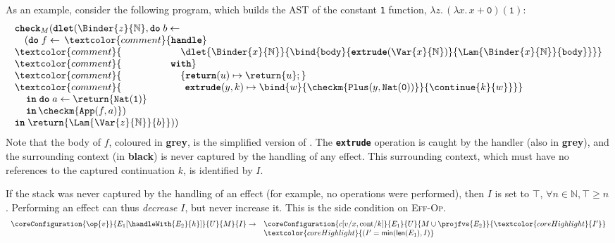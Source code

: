 As an example, consider the following program, which builds the AST of the constant \texttt{1} function, $\lambda z. \, (\lambda x. \, x + \texttt{0}) (\texttt{1})$:
\[\begin{array}{l}
  \textbf{\texttt{check}}_M(\textbf{\texttt{dlet}}(\Binder{z}{\mathbb{N}}, \textbf{\texttt{do}} \; b \leftarrow \, \\ 
  \quad (\textbf{\texttt{do}} \; f \leftarrow \, \textcolor{comment}{\textbf{\texttt{handle}}} \\
  \textcolor{comment}{\;\;\;\,\quad \quad \quad\quad\quad {\dlet{\Binder{x}{\mathbb{N}}}{
  \bind{\texttt{body}}{\textbf{\texttt{extrude}}(\Var{x}{\mathbb{N}})}{\Lam{\Binder{x}{\mathbb{N}}}{\texttt{body}}}}}} \\ 
  \textcolor{comment}{\;\;\;\,\quad \quad\quad\quad \textbf{\texttt{with}}} \\ 
  \textcolor{comment}{\;\;\;\,\quad \quad\quad\quad \quad \{ \textbf{\texttt{return}}(u) \mapsto {\return{u}};} \\ 
  \textcolor{comment}{\;\;\;\, \quad \quad\quad\quad \quad \;\, \textbf{\texttt{extrude}}(y, k) \mapsto {\bind{w}{\checkm{\texttt{Plus}(y, \texttt{Nat}(\texttt{0}))}}{\continue{k}{w}}}\}} \\ 
  \, \quad \textbf{\texttt{in}} \; \textbf{\texttt{do}} \; {a}\leftarrow {\return{\texttt{Nat}(\texttt{1})}}\\
  \, \quad \textbf{\texttt{in}} \, {\checkm{\texttt{App}(f, a)}})\; \\
  \textbf{\texttt{in}} \; \return{\Lam{\Var{z}{\mathbb{N}}}{b}})) 
\end{array}\]
Note that the body of $f$, coloured in \textbf{\textcolor{comment}{grey}}, is the simplified version of . The \textbf{\texttt{extrude}} operation is caught by the handler (also in \textbf{\textcolor{comment}{grey}}), and the surrounding context (in \textbf{black}) is never captured by the handling of any effect. This surrounding context, which must have no references to the captured continuation $k$, is identified by $I$.

If the stack was never captured by the handling of an effect (for example, no operations were performed), then $I$ is set to $\top$, $\forall n \in \mathbb{N}, \top \geq n$. Performing an effect can thus \textit{decrease} $I$, but never increase it. This is the side condition on \textsc{Eff-Op}.
\[\begin{array}{ll}\coreConfiguration{\op{v}}{E_1[\handleWith{E_2}{h}]}{U}{M}{I} \to & \coreConfiguration{c[v/x, \text{cont}/ k]}{E_1}{U}{{M \cup \projfvs{E_2}}}{\textcolor{coreHighlight}{I'}} \\ &\textcolor{coreHighlight}{(I' = \textsf{min}(\textsf{len}(E_1), I)} \end{array}\]


